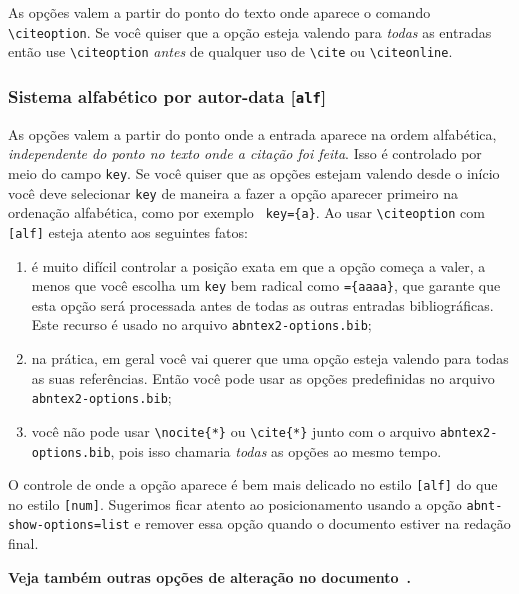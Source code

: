 \documentclass[a4paper]{ltxdoc}
\begin{document}
As opções valem a partir do ponto do texto onde aparece o comando
\verb+\citeoption+. Se você quiser que a opção esteja valendo para \emph{todas}
as entradas então use \verb+\citeoption+ \emph{antes} de qualquer uso de
\verb+\cite+ ou \verb+\citeonline+.

\subsubsection{Sistema alfabético por autor-data [{\tt alf}]}
\label{section-quando-vale-alf}

As opções valem a partir do ponto onde a entrada aparece na ordem alfabética,
\emph{independente do ponto no texto onde a citação foi feita}. Isso é
controlado por meio do campo {\tt key}. Se você quiser que as opções estejam
valendo desde o início você deve selecionar {\tt key} de maneira a fazer a
opção aparecer primeiro na ordenação alfabética, como por exemplo {\tt
key=\{a\}}. Ao usar \verb+\citeoption+ com {\tt [alf]} esteja atento aos
seguintes fatos:

\begin{enumerate}
\item é muito difícil controlar a posição exata em que a opção
      começa a valer, a menos que você escolha um {\tt key} bem
      radical como {\tt=\{aaaa\}}, que garante que esta opção será
      processada antes de todas as outras entradas bibliográficas.
      Este recurso é usado no arquivo {\tt abntex2-options.bib};
\item na prática, em geral você vai querer que uma opção esteja
      valendo para todas as suas referências. Então você pode usar
      as opções predefinidas no arquivo {\tt abntex2-options.bib};
\item você não pode usar \verb+\nocite{*}+ ou \verb+\cite{*}+
      junto com o arquivo
      {\tt abntex2-options.bib}, pois isso chamaria \emph{todas} as
      opções ao mesmo tempo.
\end{enumerate}

O controle de onde a opção aparece é bem mais delicado no estilo {\tt [alf]}
do que no estilo {\tt [num]}. Sugerimos ficar atento ao posicionamento
usando a opção {\tt abnt-show-options=list} e remover essa opção quando o
documento estiver na redação final.

{\bf Veja também outras opções de alteração no
documento~.}
\end{document}
